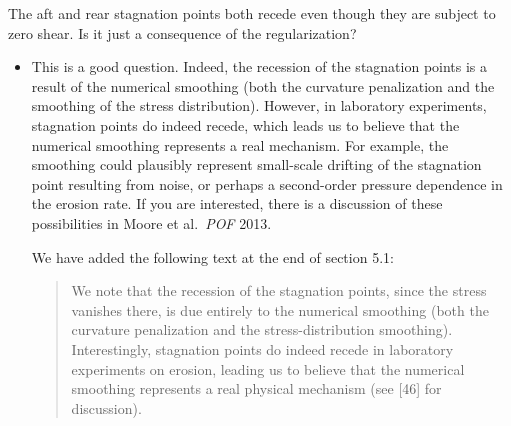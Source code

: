 \documentclass[11pt]{article}
\newcommand{\comment}[1]{{\color{blue} #1}}
\begin{document}
\noindent
\comment{The aft and rear stagnation points both recede even though they
are subject to zero shear. Is it just a consequence of the
regularization?}
\begin{itemize}
\item
This is a good question. Indeed, the recession of the stagnation points is a result of the numerical smoothing (both the curvature penalization and the smoothing of the stress distribution). However, in laboratory experiments, stagnation points do indeed recede, which leads us to believe that the numerical smoothing represents a real mechanism. For example, the smoothing could plausibly represent small-scale drifting of the stagnation point resulting from noise, or perhaps a second-order pressure dependence in the erosion rate. If you are interested, there is a discussion of these possibilities in Moore et al.~{\it POF} 2013.

We have added the following text at the end of section 5.1:
\begin{quotation}
We note that the recession of the stagnation points, since the stress vanishes there, is due entirely to the numerical smoothing (both the curvature penalization and the stress-distribution smoothing). Interestingly, stagnation points do indeed recede in laboratory experiments on erosion, leading us to believe that the numerical smoothing represents a real physical mechanism (see [46] for discussion).
\end{quotation}

\end{itemize}
\end{document}

